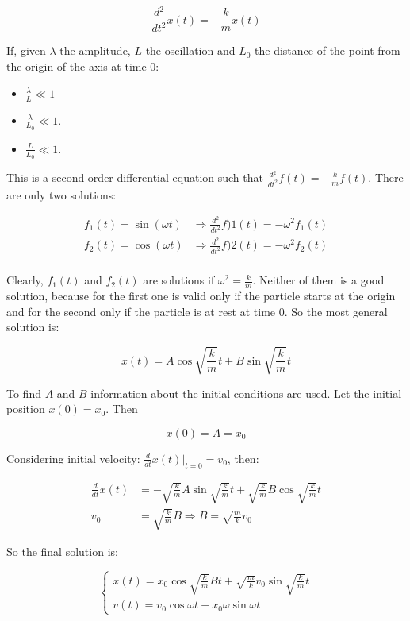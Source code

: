   $$\frac{d{^2}}{d{t^2}}x(t) = -\frac{k}{m}x(t)$$

  If, given $\lambda$ the amplitude, $L$ the oscillation and $L_0$ the distance of the point from the origin of the axis at time $0$:

  \begin{multicols}{3}
    \begin{itemize}
      \item $\frac{\lambda}{L}\ll 1$
      \item $\frac{\lambda}{L_0}\ll 1$.
      \item $\frac{L}{L_0}\ll 1$.
    \end{itemize}
  \end{multicols}

  This is a second-order differential equation such that $\frac{d{^2}}{d{t^2}}f(t) = -\frac{k}{m}f(t)$.
  There are only two solutions:

  \begin{align*}
    f_1(t) = \sin(\omega t) &\Rightarrow \frac{d{^2}}{d{t^2}}f)1(t) = -\omega^2f_1(t)\\
    f_2(t) = \cos(\omega t) &\Rightarrow \frac{d{^2}}{d{t^2}}f)2(t) = -\omega^2f_2(t)\\
  \end{align*}

  Clearly, $f_1(t)$ and $f_2(t)$ are solutions if $\omega^2 = \frac{k}{m}$.
  Neither of them is a good solution, because for the first one is valid only if the particle starts at the origin and for the second only if the particle is at rest at time $0$.
  So the most general solution is:

  $$x(t) = A\cos\sqrt{\frac{k}{m}}t+B\sin\sqrt{\frac{k}{m}}t$$

  To find $A$ and $B$ information about the initial conditions are used.
  Let the initial position $x(0) = x_0$.
  Then 

  $$x(0) = A = x_0$$

  Considering initial velocity: $\frac{d{}}{d{t}}x(t)|_{t=0} = v_0$, then:

  \begin{align*}
    \frac{d{}}{d{t}}x(t) &= -\sqrt{\frac{k}{m}}A\sin\sqrt{\frac{k}{m}}t + \sqrt{\frac{k}{m}}B\cos\sqrt{\frac{k}{m}}t\\
    v_0 &= \sqrt{\frac{k}{m}} B \Rightarrow B = \sqrt{\frac{m}{k}}v_0
  \end{align*}

  So the final solution is:

  $$\begin{cases}
    x(t) = x_0\cos\sqrt{\frac{k}{m}}Bt+\sqrt{\frac{m}{k}}v_0\sin\sqrt{\frac{k}{m}}t\\
    v(t) = v_0\cos\omega t -x_0\omega\sin\omega t
  \end{cases}$$


